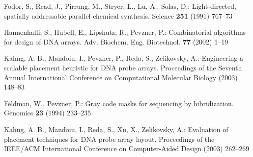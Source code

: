\documentclass{llncs}
\begin{document}
\begin{thebibliography}{99}

 Fodor, S., Read, J., Pirrung, M., Stryer, L., Lu, A., Solas, D.:
Light-directed, spatially addressable parallel chemical synthesis.
Science {\bfseries 251} (1991) 767--73

 Hannenhalli, S., Hubell, E., Lipshutz, R., Pevzner, P.:
Combinatorial algorithms for design of DNA arrays.
Adv. Biochem. Eng. Biotechnol. {\bfseries77} (2002) 1--19

 Kahng, A. B., Mandoiu, I., Pevzner, P., Reda, S., Zelikovsky, A.:
Engineering a scalable placement heuristic for DNA probe arrays.
Proceedings of the Seventh Annual International Conference on Computational Molecular Biology (2003) 148--83

 Feldman, W., Pevzner, P.:
Gray code masks for sequencing by hibridization.
Genomics {\bfseries23} (1994) 233--235

 Kahng, A. B., Mandoiu, I., Reda, S., Xu, X., Zelikovsky, A.:
Evaluation of placement techniques for DNA probe array layout.
Proceedings of the IEEE/ACM International Conference on Computer-Aided Design (2003) 262--269
 
\end{thebibliography}
\end{document}
